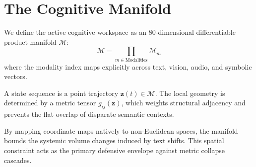 \section{The Cognitive Manifold}
\label{sec:cognitive-manifold}

We define the active cognitive
workspace as an 80-dimensional
differentiable product manifold $\mathcal{M}$:
\[
\mathcal{M} = 
\prod_{m \in \text{Modalities}} 
\mathcal{M}_m
\]
where the modality index maps
explicitly across text, vision,
audio, and symbolic vectors.

A state sequence is a point
trajectory $\mathbf{z}(t) \in \mathcal{M}$.
The local geometry is determined
by a metric tensor $g_{ij}(\mathbf{z})$,
which weights structural adjacency
and prevents the flat overlap
of disparate semantic contexts.

By mapping coordinate maps
natively to non-Euclidean spaces,
the manifold bounds the systemic
volume changes induced by text shifts.
This spatial constraint acts
as the primary defensive envelope
against metric collapse cascades.
